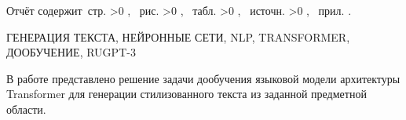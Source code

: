 \Referat

Отчёт содержит \pageref{LastPage}\,стр.%
\ifnum \totfig >0
, \totfig~рис.%
\fi
\ifnum \tottab >0
, \tottab~табл.%
\fi
%
\ifnum \totbib >0
, \totbib~источн.%
\fi
%
\ifnum \totapp >0
, \totapp~прил.%
\else
.%
\fi

ГЕНЕРАЦИЯ ТЕКСТА, НЕЙРОННЫЕ СЕТИ, NLP, TRANSFORMER, ДООБУЧЕНИЕ, RUGPT-3

В работе представлено решение задачи дообучения языковой модели архитектуры Transformer для генерации стилизованного текста из заданной предметной области.
